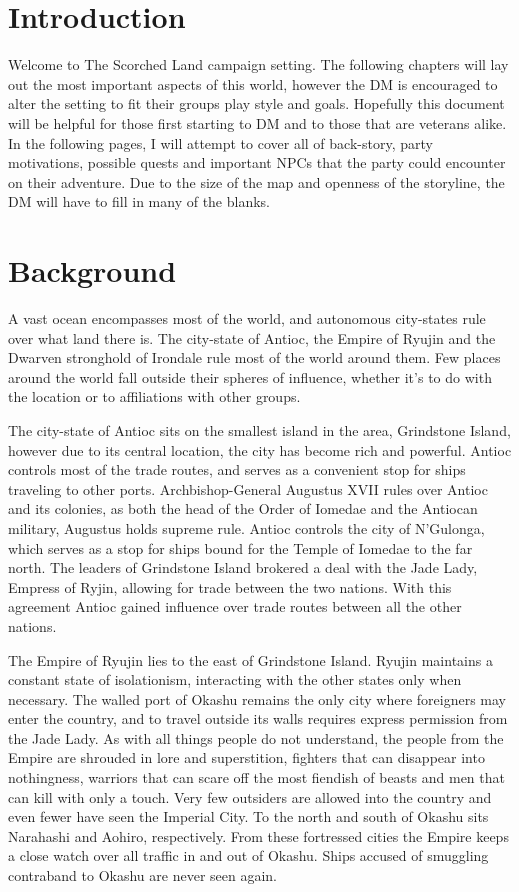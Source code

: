 \section{Introduction}

Welcome to The Scorched Land campaign setting.  The following chapters will lay 
out the most important aspects of this world, however the DM is encouraged to 
alter the setting to fit their groups play style and goals.  Hopefully this document
will be helpful for those first starting to DM and to those that are veterans
alike.  In the following pages, I will attempt to cover all of back-story, party
motivations, possible quests and important NPCs that the party could encounter on 
their adventure.  Due to the size of the map and openness of the storyline, the 
DM will have to fill in many of the blanks.

\section{Background}

A vast ocean encompasses most of the world, and autonomous city-states rule over
what land there is.  The city-state of Antioc, the Empire of Ryujin and the Dwarven
stronghold of Irondale rule most of the world around them.  Few places around the 
world fall outside their spheres of influence, whether it's to do with the 
location or to affiliations with other groups.  

The city-state of Antioc sits on the smallest island in the area, Grindstone Island,
however due to its central location, the city has become rich and powerful.  Antioc
controls most of the trade routes, and serves as a convenient stop for ships 
traveling to other ports.  Archbishop-General Augustus XVII rules over Antioc and 
its colonies, as both the head of the Order of Iomedae and the Antiocan military,
Augustus holds supreme rule.  Antioc controls the city of N'Gulonga, which serves 
as a stop for ships bound for the Temple of Iomedae to the far north.  The leaders 
of Grindstone Island brokered a deal with the Jade Lady, Empress of Ryjin, allowing
for trade between the two nations.  With this agreement Antioc gained influence 
over trade routes between all the other nations.

The Empire of Ryujin lies to the east of Grindstone Island.  Ryujin maintains a
constant state of isolationism, interacting with the other states only when
necessary.  The walled port of Okashu remains the only city where foreigners may
enter the country, and to travel outside its walls requires express permission 
from the Jade Lady.  As with all things people do not understand, the people
 from the Empire are shrouded in lore and superstition, fighters that can disappear 
into nothingness, warriors that can scare off the most fiendish of beasts and
men that can kill with only a touch.  Very few outsiders are allowed into the 
country and even fewer have seen the Imperial City.  To the north and south of 
Okashu sits Narahashi and Aohiro, respectively.  From these fortressed cities the 
Empire keeps a close watch over all traffic in and out of Okashu.  Ships accused
of smuggling contraband to Okashu are never seen again.  

